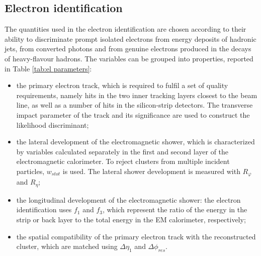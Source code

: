 \documentclass[a4paper, oneside, 11pt, openright]{book}
\begin{document}
			\subsection{Electron identification}
			The quantities used in the electron identification \cite{El ph reco} are chosen according to their ability to discriminate prompt isolated electrons from energy deposits of hadronic jets, from converted photons and from genuine electrons produced in the decays of heavy-flavour hadrons. The variables can be
			grouped into properties, reported in Table \ref{tab:el parameters}:
			\begin{itemize}
				\item the primary electron track, which is required to fulfil a set of quality requirements, namely hits in the two inner tracking layers closest to the beam line, as well as a number of hits in the silicon-strip detectors. The transverse impact parameter of the track and its significance are used to construct
				the likelihood discriminant;
				\item the lateral development of the electromagnetic shower, which is characterized by variables calculated separately in the first and second layer of the electromagnetic calorimeter. To reject clusters from multiple incident particles, $w_{s tot}$ is used. The lateral shower development is measured with $R_{\varphi}$ and $R_{\eta}$;
				\item the longitudinal development of the electromagnetic shower: the electron identification uses $f_1$ and $f_3$, which represent the ratio of the energy in the strip or back layer to the total energy in the EM calorimeter, respectively;
				\item the spatial compatibility of the primary electron track with the reconstructed cluster, which are matched using $\Delta\eta_1$ and $\Delta\phi_{res}$. 
			\end{itemize}
\end{document}
